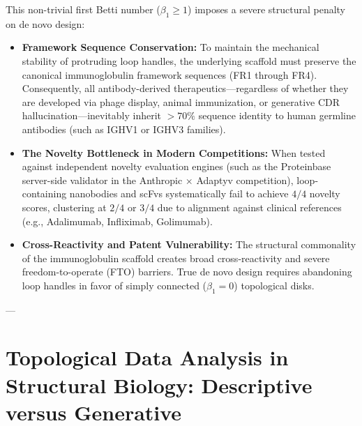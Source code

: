 This non-trivial first Betti number ($\beta_1 \ge 1$) imposes a severe structural penalty on de novo design:
\begin{itemize}[leftmargin=1.2cm]
    \item \textbf{Framework Sequence Conservation:} To maintain the mechanical stability of protruding loop handles, the underlying scaffold must preserve the canonical immunoglobulin framework sequences (FR1 through FR4). Consequently, all antibody-derived therapeutics—regardless of whether they are developed via phage display, animal immunization, or generative CDR hallucination—inevitably inherit $>70\%$ sequence identity to human germline antibodies (such as IGHV1 or IGHV3 families).
    \item \textbf{The Novelty Bottleneck in Modern Competitions:} When tested against independent novelty evaluation engines (such as the Proteinbase server-side validator in the Anthropic $\times$ Adaptyv competition), loop-containing nanobodies and scFvs systematically fail to achieve $4/4$ novelty scores, clustering at $2/4$ or $3/4$ due to alignment against clinical references (e.g., Adalimumab, Infliximab, Golimumab).
    \item \textbf{Cross-Reactivity and Patent Vulnerability:} The structural commonality of the immunoglobulin scaffold creates broad cross-reactivity and severe freedom-to-operate (FTO) barriers. True de novo design requires abandoning loop handles in favor of simply connected ($\beta_1 = 0$) topological disks.
\end{itemize}

---

\section{Topological Data Analysis in Structural Biology: Descriptive versus Generative}
\label{sec:tda_structural_biology}

